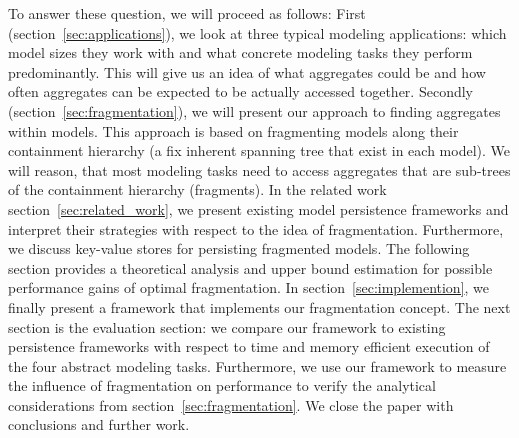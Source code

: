 To answer these question, we will proceed as follows: First (section~\ref{sec:applications}), we look at three typical modeling applications: which model sizes they work with and what concrete modeling tasks they perform predominantly. This will give us an idea of what aggregates could be and how often aggregates can be expected to be actually accessed together. 
Secondly (section~\ref{sec:fragmentation}), we will present our approach to finding aggregates within models. This approach is based on fragmenting models along their containment hierarchy (a fix inherent spanning tree that exist in each model). We will reason, that most modeling tasks need to access aggregates that are sub-trees of the containment hierarchy (fragments). 
In the related work section~\ref{sec:related_work}, we present existing model persistence frameworks and interpret their strategies with respect to the idea of fragmentation. Furthermore, we discuss key-value stores for persisting fragmented models.
The following section provides a theoretical analysis and upper bound estimation for possible performance gains of optimal fragmentation.
In section~\ref{sec:implemention}, we finally present a framework that implements our fragmentation concept.
The next section is the evaluation section: we compare our framework to existing persistence frameworks with respect to time and memory efficient execution of the four abstract modeling tasks. Furthermore, we use our framework to measure the influence of fragmentation on performance to verify the analytical considerations from section~\ref{sec:fragmentation}.
We close the paper with conclusions and further work. 

